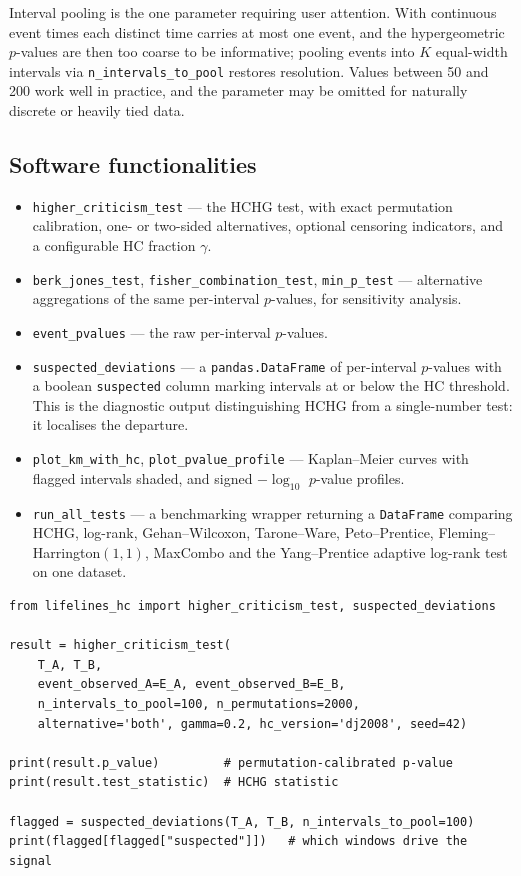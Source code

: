 \documentclass[11pt]{article}
\begin{document}
Interval pooling is the one parameter requiring user attention. With
continuous event times each distinct time carries at most one event, and the
hypergeometric $p$-values are then too coarse to be informative; pooling
events into $K$ equal-width intervals via \texttt{n\_intervals\_to\_pool}
restores resolution. Values between 50 and 200 work well in practice, and
the parameter may be omitted for naturally discrete or heavily tied data.

\subsection{Software functionalities}

\begin{itemize}\itemsep2pt
\item \texttt{higher\_criticism\_test} --- the HCHG test, with exact
      permutation calibration, one- or two-sided alternatives, optional
      censoring indicators, and a configurable HC fraction $\gamma$.
\item \texttt{berk\_jones\_test}, \texttt{fisher\_combination\_test},
      \texttt{min\_p\_test} --- alternative aggregations of the same
      per-interval $p$-values, for sensitivity analysis.
\item \texttt{event\_pvalues} --- the raw per-interval $p$-values.
\item \texttt{suspected\_deviations} --- a \texttt{pandas.DataFrame} of
      per-interval $p$-values with a boolean \texttt{suspected} column
      marking intervals at or below the HC threshold. This is the
      diagnostic output distinguishing HCHG from a single-number test: it
      localises the departure.
\item \texttt{plot\_km\_with\_hc}, \texttt{plot\_pvalue\_profile} ---
      Kaplan--Meier curves with flagged intervals shaded, and signed
      $-\log_{10}$ $p$-value profiles.
\item \texttt{run\_all\_tests} --- a benchmarking wrapper returning a
      \texttt{DataFrame} comparing HCHG, log-rank, Gehan--Wilcoxon,
      Tarone--Ware, Peto--Prentice, Fleming--Harrington$(1,1)$, MaxCombo and
      the Yang--Prentice adaptive log-rank test on one dataset.
\end{itemize}

\begin{lstlisting}
from lifelines_hc import higher_criticism_test, suspected_deviations

result = higher_criticism_test(
    T_A, T_B,
    event_observed_A=E_A, event_observed_B=E_B,
    n_intervals_to_pool=100, n_permutations=2000,
    alternative='both', gamma=0.2, hc_version='dj2008', seed=42)

print(result.p_value)         # permutation-calibrated p-value
print(result.test_statistic)  # HCHG statistic

flagged = suspected_deviations(T_A, T_B, n_intervals_to_pool=100)
print(flagged[flagged["suspected"]])   # which windows drive the signal
\end{lstlisting}
\end{document}
